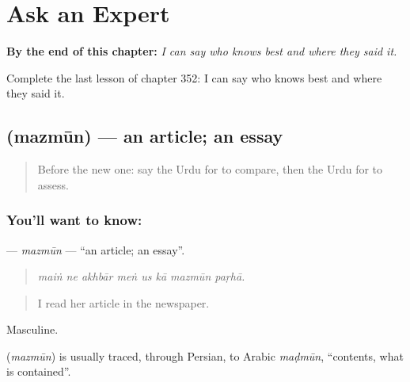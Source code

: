 
\chapter{Ask an Expert}
\label{ch:ur-ask-an-expert}

\begin{chapteropening}
\textbf{By the end of this chapter:} \emph{I can say who knows best and where they said it.}

Complete the last lesson of chapter 352: I can say who knows best and where they said it.
\end{chapteropening}

\section[\texorpdfstring{\ur{مضمون} (mazmūn)}{مضمون (mazmūn)}]{ (mazmūn) — an article; an essay}

\label{lesson:UR-C352-mazmun}



\begin{quote}
Before the new one: say the Urdu for to compare, then the Urdu for to assess.
\end{quote}

\subsection*{You'll want to know: }
\textbf{} — \emph{mazmūn} — \textquotedblleft{}an article; an essay\textquotedblright{}.

\begin{quote}
       
\end{quote}

\begin{quote}
\emph{maiṅ ne akhbār meṅ us kā mazmūn paṛhā.}
\end{quote}

\begin{quote}
I read her article in the newspaper.
\end{quote}

Masculine.

\begin{cousinweb}
\textbf{} (\emph{mazmūn}) is usually traced, through Persian, to Arabic \emph{maḍmūn}, \textquotedblleft{}contents, what is contained\textquotedblright{}.
\end{cousinweb}

